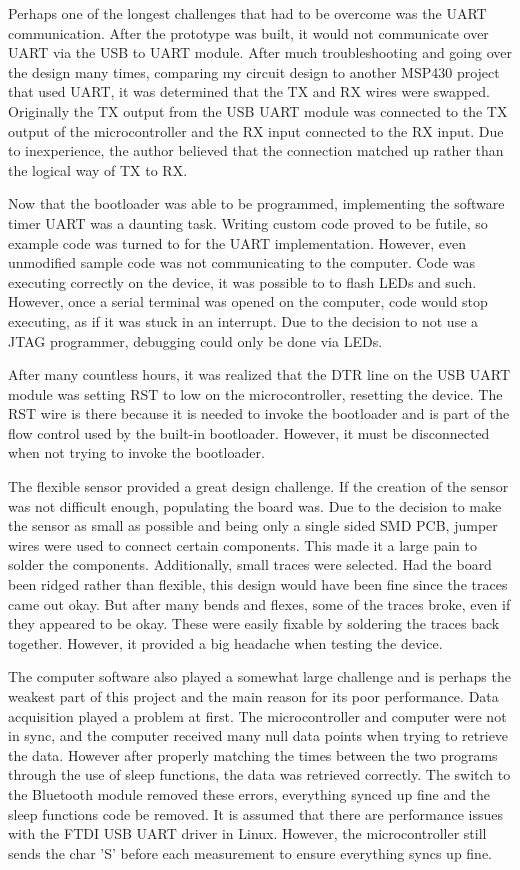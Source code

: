 Perhaps one of the longest challenges that had to be overcome was the UART communication. After the prototype was built, it would not communicate over UART via the USB to UART module. After much troubleshooting and going over the design many times, comparing my circuit design to another MSP430 project that used UART, it was determined that the TX and RX wires were swapped. Originally the TX output from the USB UART module was connected to the TX output of the microcontroller and the RX input connected to the RX input. Due to inexperience, the author believed that the connection matched up rather than the logical way of TX to RX.

Now that the bootloader was able to be programmed, implementing the software timer UART was a daunting task. Writing custom code proved to be futile, so example code was turned to for the UART implementation. However, even unmodified sample code was not communicating to the computer. Code was executing correctly on the device, it was possible to to flash LEDs and such. However, once a serial terminal was opened on the computer, code would stop executing, as if it was stuck in an interrupt. Due to the decision to not use a JTAG programmer, debugging could only be done via LEDs. 

After many countless hours, it was realized that the DTR line on the USB UART module was setting RST to low on the microcontroller, resetting the device. The RST wire is there because it is needed to invoke the bootloader and is part of the flow control used by the built-in bootloader. However, it must be disconnected when not trying to invoke the bootloader.

The flexible sensor provided a great design challenge. If the  creation of the sensor was not difficult enough, populating the board was. Due to the decision to make the sensor as small as possible and being only a single sided SMD PCB, jumper wires were used to connect certain components. This made it a large pain to solder the components. Additionally, small traces were selected. Had the board been ridged rather than flexible, this design would have been fine since the traces came out okay. But after many bends and flexes, some of the traces broke, even if they appeared to be okay. These were easily fixable by soldering the traces back together. However, it provided a big headache when testing the device.

The computer software also played a somewhat large challenge and is perhaps the weakest part of this project and the main reason for its poor performance. Data acquisition played a problem at first. The microcontroller and computer were not in sync, and the computer received many null data points when trying to retrieve the data. However after properly matching the times between the two programs through the use of sleep functions, the data was retrieved correctly. The switch to the Bluetooth module removed these errors, everything synced up fine and the sleep functions code be removed. It is assumed that there are performance issues with the FTDI USB UART driver in Linux. However, the microcontroller still sends the char 'S' before each measurement to ensure everything syncs up fine.
